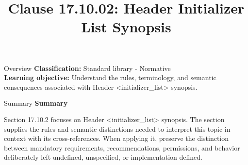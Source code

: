 \documentclass[10pt,letterpaper]{article}
\title{Clause 17.10.02: Header Initializer List Synopsis}
\author{}
\date{}
\begin{document}
\maketitle
\begin{CornellOverviewBox}{Overview}
\textbf{Classification:} Standard library - Normative\\[2pt]
\textbf{Learning objective:} Understand the rules, terminology, and semantic consequences associated with Header <initializer\_list> synopsis.
\end{CornellOverviewBox}\begin{CornellSummaryBox}{Summary}
{\sffamily\bfseries\color{Accent} Summary}\par\vspace{3pt}Section 17.10.2 focuses on Header <initializer\_list> synopsis. The section supplies the rules and semantic distinctions needed to interpret this topic in context with its cross-references. When applying it, preserve the distinction between mandatory requirements, recommendations, permissions, and behavior deliberately left undefined, unspecified, or implementation-defined.
\end{CornellSummaryBox}
\end{document}
